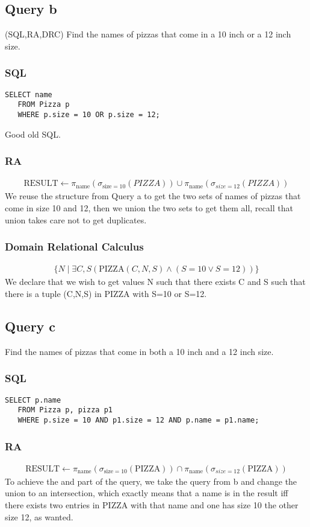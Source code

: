 \documentclass{article}
\theoremstyle{remark}
\numberwithin{equation}{section}
\begin{document}
\subsection{Query b}
(SQL,RA,DRC) Find the names of pizzas that come in a 10 inch or a 12 inch size.\\
\subsubsection{SQL}
\begin{verbatim}
SELECT name
   FROM Pizza p
   WHERE p.size = 10 OR p.size = 12;
\end{verbatim}
Good old SQL.
\subsubsection{RA}
\begin{align*}
    \text{RESULT} \leftarrow\pi_{\text{name}}(\sigma_{\text{size}=10}(PIZZA))\cup\pi_{\text{name}}(\sigma_{\textit{size}=12}(PIZZA))
\end{align*}
We reuse the structure from Query a to get the two sets of names of pizzas that come in size 10 and 12, then we union the two sets to get them all, recall that union takes care not to get duplicates.
\subsubsection{Domain Relational Calculus}
\begin{align*}
    \{N\mid\exists C,S(\text{PIZZA}(C,N,S) \wedge( S = 10 \vee S  = 12 ))\}
\end{align*}
We declare that we wish to get values N such that there exists C and S such that there is a tuple (C,N,S) in PIZZA with S=10 or S=12.
\subsection{Query c}
Find the names of pizzas that come in both a 10 inch and a 12 inch size.\\
\subsubsection{SQL}
\begin{verbatim}
SELECT p.name
   FROM Pizza p, pizza p1
   WHERE p.size = 10 AND p1.size = 12 AND p.name = p1.name;
\end{verbatim}

\subsubsection{RA}
\begin{align*}
    \text{RESULT} \leftarrow\pi_{\text{name}}(\sigma_{\text{size}=10}(\text{PIZZA}))\cap\pi_{\text{name}}(\sigma_{\textit{size}=12}(\text{PIZZA}))
\end{align*}
To achieve the and part of the query, we take the query from b and change the union to an intersection, which exactly means that a name is in the result iff there exists two entries in PIZZA with that name and one has size 10 the other size 12, as wanted.
\end{document}
